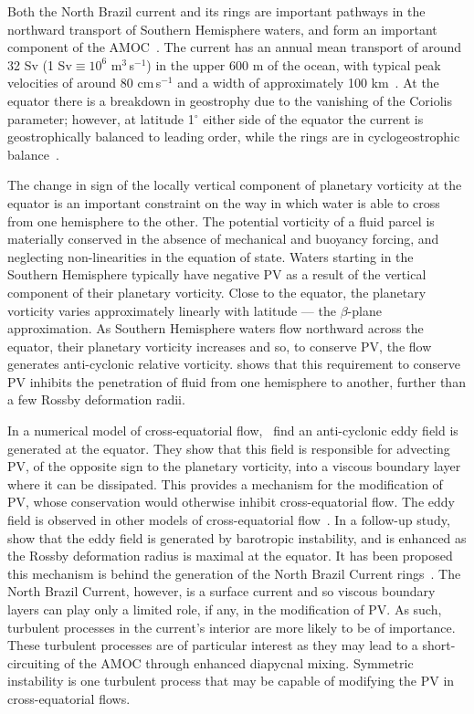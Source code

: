Both the North Brazil current and its rings are important pathways in the northward transport of Southern Hemisphere waters, and form an important component of the AMOC~\citep{Bower2019}. The current has an annual mean transport of around 32 Sv (1 Sv$\equiv 10^{6}$ m$^3$\,s$^{-1}$) in the upper 600 m of the ocean, with typical peak velocities of around 80 cm\,s$^{-1}$ and a width of approximately 100 km~\citep{Johns1998, Schott1993}. At the equator there is a breakdown in geostrophy due to the vanishing of the Coriolis parameter; however, at latitude 1$^\circ$ either side of the equator the current is geostrophically balanced to leading order, while the rings are in cyclogeostrophic balance~\citep{viannaSeasonalInterannualStudy2003, Castelao2011}.

The change in sign of the locally vertical component of planetary vorticity at the equator is an important constraint on the way in which water is able to cross from one hemisphere to the other. The potential vorticity of a fluid parcel is materially conserved in the absence of mechanical and buoyancy forcing, and neglecting non-linearities in the equation of state. Waters starting in the Southern Hemisphere typically have negative PV as a result of the vertical component of their planetary vorticity. Close to the equator, the planetary vorticity varies approximately linearly with latitude --- the $\beta$-plane approximation. As Southern Hemisphere waters flow northward across the equator, their planetary vorticity increases and so, to conserve PV, the flow generates anti-cyclonic relative vorticity. \citet{Killworth1991} shows that this requirement to conserve PV inhibits the penetration of fluid from one hemisphere to another, further than a few Rossby deformation radii.

In a numerical model of cross-equatorial flow,~\citet{Edwards1998I} find an anti-cyclonic eddy field is generated at the equator. They show that this field is responsible for advecting PV, of the opposite sign to the planetary vorticity, into a viscous boundary layer where it can be dissipated. This provides a mechanism for the modification of PV, whose conservation would otherwise inhibit cross-equatorial flow. The eddy field is observed in other models of cross-equatorial flow~\citep[e.g.][]{Jochum2003, Goes2009}. In a follow-up study,~\citet{Edwards1998II} show that the eddy field is generated by barotropic instability, and is enhanced as the Rossby deformation radius is maximal at the equator. It has been proposed this mechanism is behind the generation of the North Brazil Current rings~\citep{Jochum2003}. The North Brazil Current, however, is a surface current and so viscous boundary layers can play only a limited role, if any, in the modification of PV. As such, turbulent processes in the current's interior are more likely to be of importance. These turbulent processes are of particular interest as they may lead to a short-circuiting of the AMOC through enhanced diapycnal mixing. Symmetric instability is one turbulent process that may be capable of modifying the PV in cross-equatorial flows.

